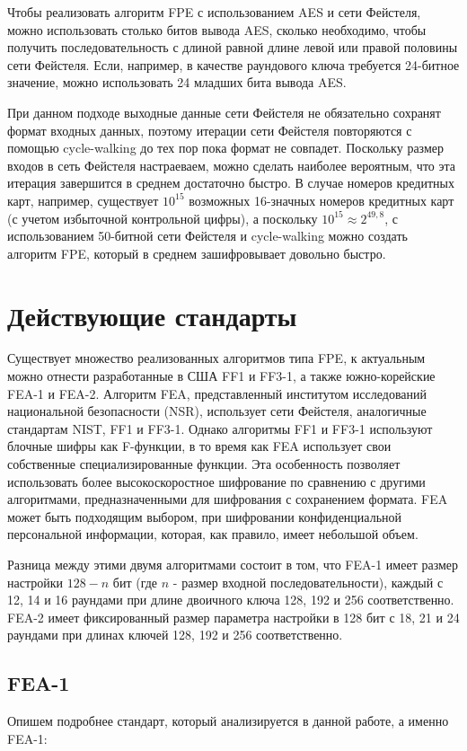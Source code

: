 \documentclass[utf8x, 14pt]{G7-32} %
\begin{document}
Чтобы реализовать алгоритм FPE с использованием AES и сети Фейстеля, можно использовать столько битов вывода AES, сколько необходимо, чтобы получить последовательность с длиной равной длине левой или правой половины сети Фейстеля. Если, например, в качестве раундового ключа требуется 24-битное значение, можно использовать 24 младших бита вывода AES.


При данном подходе выходные данные сети Фейстеля не обязательно сохранят формат входных данных, поэтому итерации сети Фейстеля повторяются с помощью cycle-walking до тех пор пока формат не совпадет. Поскольку размер входов в сеть Фейстеля настраеваем, можно сделать наиболее вероятным, что эта итерация завершится в среднем достаточно быстро. В случае номеров кредитных карт, например, существует $10^{15}$ возможных 16-значных номеров кредитных карт (с учетом избыточной контрольной цифры), а поскольку $10^{15} \approx 2^{49,8}$, с использованием 50-битной сети Фейстеля и cycle-walking можно создать алгоритм FPE, который в среднем зашифровывает довольно быстро.

\section{Действующие стандарты} %
Существует множество реализованных алгоритмов типа FPE, к актуальным можно отнести разработанные в США FF1 и FF3-1, а также южно-корейские FEA-1 и FEA-2.
Алгоритм FEA, представленный институтом исследований национальной безопасности (NSR), использует сети Фейстеля, аналогичные стандартам NIST, FF1 и FF3-1. Однако алгоритмы FF1 и FF3-1 используют блочные шифры как F-функции, в то время как FEA использует свои собственные специализированные функции. Эта особенность позволяет использовать более высокоскоростное шифрование по сравнению с другими алгоритмами, предназначенными для шифрования с сохранением формата. FEA может быть подходящим выбором, при шифровании конфиденциальной персональной информации, которая, как правило, имеет небольшой объем.


Разница между этими двумя алгоритмами состоит в том, что FEA-1 имеет размер настройки $128-n$ бит (где $n$ - размер входной последовательности), каждый с 12, 14 и 16 раундами при длине двоичного ключа 128, 192 и 256 соответственно. FEA-2 имеет фиксированный размер параметра настройки в 128 бит с 18, 21 и 24 раундами при длинах ключей 128, 192 и 256 соответственно.

\subsection{FEA-1}
Опишем подробнее стандарт, который анализируется в данной работе, а именно FEA-1:
\end{document}
